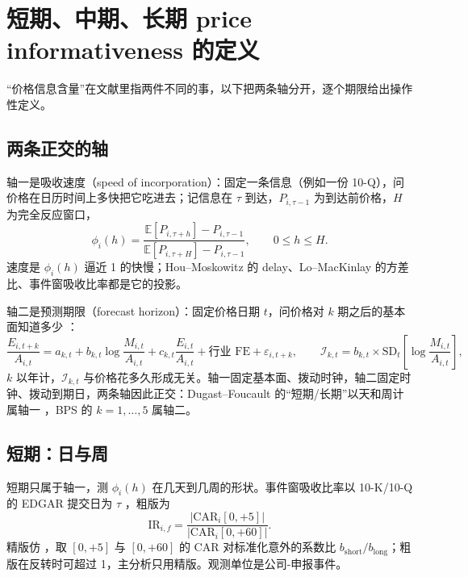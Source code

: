 \documentclass[a4paper,11pt]{ctexart}
\begin{document}
\section{短期、中期、长期 price informativeness 的定义}\label{sec:05-horizons}

“价格信息含量”在文献里指两件不同的事，以下把两条轴分开，逐个期限给出操作性定义。

\subsection{两条正交的轴}\label{sec:05-axes}

轴一是吸收速度（speed of incorporation）：固定一条信息（例如一份 10-Q），问价格在日历时间上多快把它吃进去；记信息在 $\tau$ 到达，$P_{i,\tau-1}$ 为到达前价格，$H$ 为完全反应窗口，
\begin{equation}\label{eq:05-absorption}
\phi_i(h)=\frac{\mathbb{E}[P_{i,\tau+h}]-P_{i,\tau-1}}{\mathbb{E}[P_{i,\tau+H}]-P_{i,\tau-1}},\qquad 0\le h\le H .
\end{equation}
速度是 $\phi_i(h)$ 逼近 1 的快慢；Hou--Moskowitz 的 delay、Lo--MacKinlay 的方差比、事件窗吸收比率都是它的投影。

轴二是预测期限（forecast horizon）：固定价格日期 $t$，问价格对 $k$ 期之后的基本面知道多少 \citep{baiphilipponsavov2016}：
\begin{equation}\label{eq:05-bps}
\frac{E_{i,t+k}}{A_{i,t}}=a_{k,t}+b_{k,t}\log\frac{M_{i,t}}{A_{i,t}}+c_{k,t}\frac{E_{i,t}}{A_{i,t}}+\text{行业 FE}+\varepsilon_{i,t+k},\qquad
\mathcal{I}_{k,t}=b_{k,t}\times \mathrm{SD}_t\!\left[\log\frac{M_{i,t}}{A_{i,t}}\right],
\end{equation}
$k$ 以年计，$\mathcal{I}_{k,t}$ 与价格花多久形成无关。轴一固定基本面、拨动时钟，轴二固定时钟、拨动到期日，两条轴因此正交：Dugast--Foucault 的“短期/长期”以天和周计属轴一 \citep{dugastfoucault2018}，BPS 的 $k=1,\dots,5$ 属轴二。

\subsection{短期：日与周}\label{sec:05-short}

短期只属于轴一，测 $\phi_i(h)$ 在几天到几周的形状。事件窗吸收比率以 10-K/10-Q 的 EDGAR 提交日为 $\tau$ \citep{liramesh2009}，粗版为
\begin{equation}\label{eq:05-ir}
\mathrm{IR}_{i,f}=\frac{\lvert\mathrm{CAR}_{i}[0,+5]\rvert}{\lvert\mathrm{CAR}_{i}[0,+60]\rvert} .
\end{equation}
精版仿 \citet{dellavignapollet2009}，取 $[0,+5]$ 与 $[0,+60]$ 的 CAR 对标准化意外的系数比 $b_{\text{short}}/b_{\text{long}}$；粗版在反转时可超过 1，主分析只用精版。观测单位是公司-申报事件。
\end{document}

